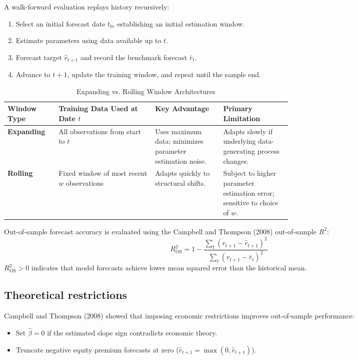 A walk-forward evaluation replays history recursively:
\begin{enumerate}
  \item Select an initial forecast date $t_0$, establishing an initial estimation window.
  \item Estimate parameters using data available up to $t$.
  \item Forecast target $\hat{r}_{t+1}$ and record the benchmark forecast $\bar{r}_t$.
  \item Advance to $t+1$, update the training window, and repeat until the sample end.
\end{enumerate}

\begin{table}[htbp]
\centering
\small
\caption{Expanding vs. Rolling Window Architectures}
\label{tab:08-windows}
\begin{tabularx}{0.95\linewidth}{@{}>{\raggedright\arraybackslash}p{0.18\linewidth}>{\raggedright\arraybackslash}X>{\raggedright\arraybackslash}p{0.24\linewidth}>{\raggedright\arraybackslash}p{0.24\linewidth}@{}}
\toprule
Window Type & Training Data Used at Date $t$ & Key Advantage & Primary Limitation \\
\midrule
\textbf{Expanding} & All observations from start to $t$ & Uses maximum data; minimizes parameter estimation noise. & Adapts slowly if underlying data-generating process changes. \\
\textbf{Rolling} & Fixed window of most recent $w$ observations & Adapts quickly to structural shifts. & Subject to higher parameter estimation error; sensitive to choice of $w$. \\
\bottomrule
\end{tabularx}
\end{table}

Out-of-sample forecast accuracy is evaluated using the Campbell and Thompson (2008) out-of-sample $R^2$:
\begin{equation}
  R^2_{\text{OS}} = 1 - \frac{\sum_{t} \left( r_{t+1} - \hat{r}_{t+1} \right)^2}{\sum_{t} \left( r_{t+1} - \bar{r}_t \right)^2}
  \label{eq:08-r2os}
\end{equation}
$R^2_{\text{OS}} > 0$ indicates that model forecasts achieve lower mean squared error than the historical mean.

\subsection{Theoretical restrictions}
Campbell and Thompson (2008) showed that imposing economic restrictions improves out-of-sample performance:
\begin{itemize}
  \item Set $\hat{\beta} = 0$ if the estimated slope sign contradicts economic theory.
  \item Truncate negative equity premium forecasts at zero ($\hat{r}_{t+1} = \max(0, \hat{r}_{t+1})$).
\end{itemize}

